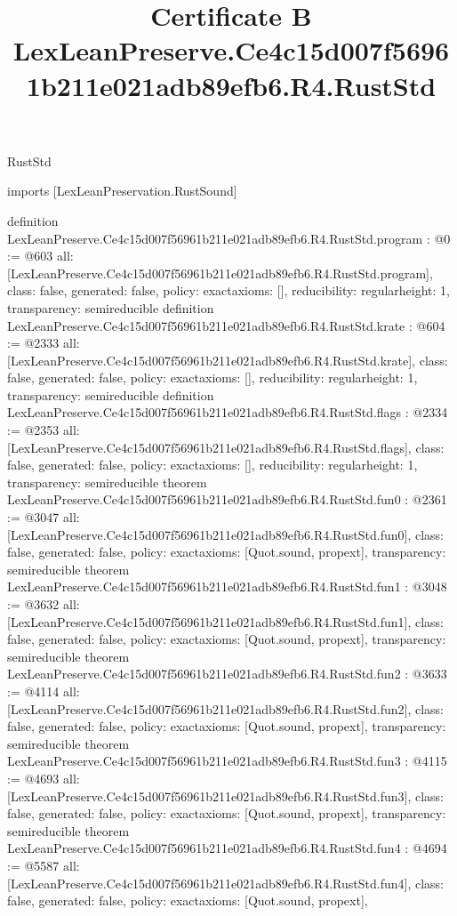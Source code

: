 \begin{lexlean}{RustStd}
\title{Certificate B LexLeanPreserve.Ce4c15d007f56961b211e021adb89efb6.R4.RustStd}
\begin{coremodule}
imports [LexLeanPreservation.RustSound]

definition LexLeanPreserve.Ce4c15d007f56961b211e021adb89efb6.R4.RustStd.program : @0 := @603 {
  all: [LexLeanPreserve.Ce4c15d007f56961b211e021adb89efb6.R4.RustStd.program],
  class: false,
  generated: false,
  policy: exact{axioms: []},
  reducibility: regular{height: 1},
  transparency: semireducible
}
definition LexLeanPreserve.Ce4c15d007f56961b211e021adb89efb6.R4.RustStd.krate : @604 := @2333 {
  all: [LexLeanPreserve.Ce4c15d007f56961b211e021adb89efb6.R4.RustStd.krate],
  class: false,
  generated: false,
  policy: exact{axioms: []},
  reducibility: regular{height: 1},
  transparency: semireducible
}
definition LexLeanPreserve.Ce4c15d007f56961b211e021adb89efb6.R4.RustStd.flags : @2334 := @2353 {
  all: [LexLeanPreserve.Ce4c15d007f56961b211e021adb89efb6.R4.RustStd.flags],
  class: false,
  generated: false,
  policy: exact{axioms: []},
  reducibility: regular{height: 1},
  transparency: semireducible
}
theorem LexLeanPreserve.Ce4c15d007f56961b211e021adb89efb6.R4.RustStd.fun0 : @2361 := @3047 {
  all: [LexLeanPreserve.Ce4c15d007f56961b211e021adb89efb6.R4.RustStd.fun0],
  class: false,
  generated: false,
  policy: exact{axioms: [Quot.sound, propext]},
  transparency: semireducible
}
theorem LexLeanPreserve.Ce4c15d007f56961b211e021adb89efb6.R4.RustStd.fun1 : @3048 := @3632 {
  all: [LexLeanPreserve.Ce4c15d007f56961b211e021adb89efb6.R4.RustStd.fun1],
  class: false,
  generated: false,
  policy: exact{axioms: [Quot.sound, propext]},
  transparency: semireducible
}
theorem LexLeanPreserve.Ce4c15d007f56961b211e021adb89efb6.R4.RustStd.fun2 : @3633 := @4114 {
  all: [LexLeanPreserve.Ce4c15d007f56961b211e021adb89efb6.R4.RustStd.fun2],
  class: false,
  generated: false,
  policy: exact{axioms: [Quot.sound, propext]},
  transparency: semireducible
}
theorem LexLeanPreserve.Ce4c15d007f56961b211e021adb89efb6.R4.RustStd.fun3 : @4115 := @4693 {
  all: [LexLeanPreserve.Ce4c15d007f56961b211e021adb89efb6.R4.RustStd.fun3],
  class: false,
  generated: false,
  policy: exact{axioms: [Quot.sound, propext]},
  transparency: semireducible
}
theorem LexLeanPreserve.Ce4c15d007f56961b211e021adb89efb6.R4.RustStd.fun4 : @4694 := @5587 {
  all: [LexLeanPreserve.Ce4c15d007f56961b211e021adb89efb6.R4.RustStd.fun4],
  class: false,
  generated: false,
  policy: exact{axioms: [Quot.sound, propext]},
}
\end{coremodule}
\end{lexlean}
